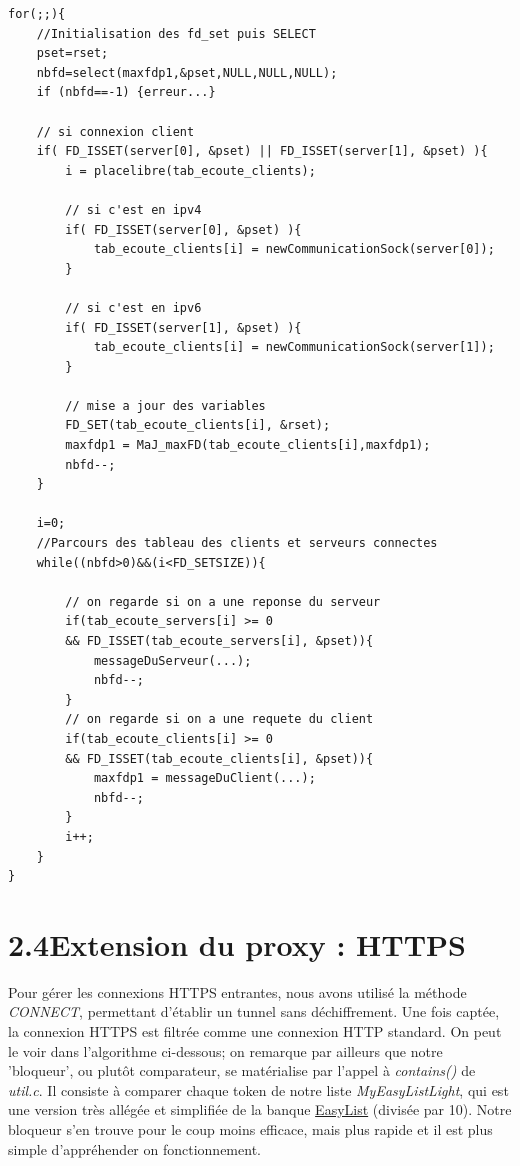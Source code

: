 \documentclass[12pt, a4paper]{report}
\begin{document}
\renewcommand{\lstlistingname}{Algorithm 2.3.}
\begin{lstlisting}[caption=Algorithme de gestion multi-clients et gestion IPv4/IPv6 (myAdBlock.c)]
for(;;){
	//Initialisation des fd_set puis SELECT
	pset=rset;
	nbfd=select(maxfdp1,&pset,NULL,NULL,NULL);
	if (nbfd==-1) {erreur...}
	
	// si connexion client
	if( FD_ISSET(server[0], &pset) || FD_ISSET(server[1], &pset) ){
		i = placelibre(tab_ecoute_clients);
		
		// si c'est en ipv4
		if( FD_ISSET(server[0], &pset) ){
			tab_ecoute_clients[i] = newCommunicationSock(server[0]);
		}
		
		// si c'est en ipv6 
		if( FD_ISSET(server[1], &pset) ){	
			tab_ecoute_clients[i] = newCommunicationSock(server[1]);
		}
		
		// mise a jour des variables
		FD_SET(tab_ecoute_clients[i], &rset);
		maxfdp1 = MaJ_maxFD(tab_ecoute_clients[i],maxfdp1);
		nbfd--;
	}
	
	i=0;
	//Parcours des tableau des clients et serveurs connectes
	while((nbfd>0)&&(i<FD_SETSIZE)){
		
		// on regarde si on a une reponse du serveur
		if(tab_ecoute_servers[i] >= 0 
		&& FD_ISSET(tab_ecoute_servers[i], &pset)){
			messageDuServeur(...);
			nbfd--;
		}
		// on regarde si on a une requete du client
		if(tab_ecoute_clients[i] >= 0 
		&& FD_ISSET(tab_ecoute_clients[i], &pset)){
			maxfdp1 = messageDuClient(...);
			nbfd--;
		}
		i++;
	}
}
\end{lstlisting}

\newpage
\hypersetup{linkcolor=blue}
\section*{\hspace{0.6cm}2.4\hspace{0.6cm}Extension du proxy : HTTPS}
\hspace{1cm} Pour gérer les connexions HTTPS entrantes, nous avons utilisé la méthode \textit{CONNECT}, permettant d'établir un tunnel sans déchiffrement. Une fois captée, la connexion HTTPS est filtrée comme une connexion HTTP standard. On peut le voir dans l'algorithme ci-dessous; on remarque par ailleurs que notre 'bloqueur', ou plutôt comparateur, se matérialise par l'appel à \textit{contains()} de \textit{util.c}. Il consiste à comparer chaque token de notre liste \textit{MyEasyListLight}, qui est une version très allégée et simplifiée de la banque \href{https://easylist.to}{EasyList} (divisée par 10). Notre bloqueur s'en trouve pour le coup moins efficace, mais plus rapide et il est plus simple d'appréhender on fonctionnement.\\
\end{document}
